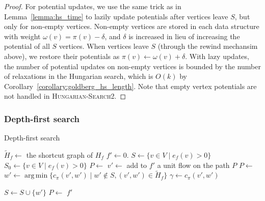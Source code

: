 \documentclass[11pt]{article}
\DeclareMathOperator*{\argmin}{arg\,min}
\theoremstyle{plain}
\numberwithin{figure}{section}
\begin{document}
\begin{proof}
For potential updates, we use the same trick as in Lemma~\ref{lemma:hs_time} to
lazily update potentials after vertices leave $S$, but only for non-empty
vertices.
Non-empty vertices are stored in each data structure with weight
$\omega(v) = \pi(v) - \delta$, and $\delta$ is increased in lieu of increasing
the potential of all $S$ vertices.
When vertices leave $S$ (through the rewind mechansim above), we restore
their potentials as $\pi(v) \gets \omega(v) + \delta$.
With lazy updates, the number of potential updates on non-empty vertices is
bounded by the number of relaxations in the Hungarian search, which is $O(k)$
by Corollary~\ref{corollary:goldberg_hs_length}.
Note that empty vertex potentials are not handled in
\textsc{Hungarian-Search2}.
\end{proof}

\subsubsection{Depth-first search}

\begin{algorithm}
\caption{Depth-first search}
\label{algorithm:goldberg_dfs}
\begin{algorithmic}[1]
	\State $\tilde{H}_f \gets$ the shortcut graph of $H_f$
	\State $f' \gets 0$.
	\State $S \gets \{v \in V \mid e_f(v) > 0\}$
	\State $S_0 \gets \{v \in V \mid e_f(v) > 0\}$
	\State $P \gets$ 
	\Repeat
		\State $v' \gets$ 
			\State add to $f'$ a unit flow on the path $P$
			\State $P \gets$ 
		\Else
			\State $w' \gets \argmin\{c_\pi(v', w') \mid w' \not\in S, (v', w') \in \tilde{H}_f\}$
			\State $\gamma \gets c_\pi(v', w')$

				\State $S \gets S \cup \{w'\}$
				\State $P \gets$ 
			\Else
				\State {}
			\EndIf
		\EndIf
	\State\Return $f'$
\EndFunction
\end{algorithmic}
\end{algorithm}
\end{document}
